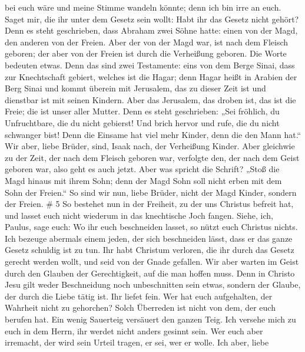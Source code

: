 bei euch wäre und meine Stimme wandeln könnte; denn ich bin irre an
euch.  Saget mir, die ihr unter dem Gesetz sein wollt: Habt
ihr das Gesetz nicht gehört?  Denn es steht geschrieben,
dass Abraham zwei Söhne hatte: einen von der Magd, den anderen von der
Freien.  Aber der von der Magd war, ist nach dem Fleisch
geboren; der aber von der Freien ist durch die Verheißung geboren.
 Die Worte bedeuten etwas. Denn das sind zwei Testamente:
eins von dem Berge Sinai, dass zur Knechtschaft gebiert, welches ist die
Hagar;  denn Hagar heißt in Arabien der Berg Sinai und
kommt überein mit Jerusalem, das zu dieser Zeit ist und dienstbar ist
mit seinen Kindern.  Aber das Jerusalem, das droben ist,
das ist die Freie; die ist unser aller Mutter.  Denn es
steht geschrieben: „Sei fröhlich, du Unfruchtbare, die du nicht
gebierst! Und brich hervor und rufe, die du nicht schwanger bist! Denn
die Einsame hat viel mehr Kinder, denn die den Mann hat.`` 
Wir aber, liebe Brüder, sind, Isaak nach, der Verheißung Kinder.
 Aber gleichwie zu der Zeit, der nach dem Fleisch geboren
war, verfolgte den, der nach dem Geist geboren war, also geht es auch
jetzt.  Aber was spricht die Schrift? „Stoß die Magd hinaus
mit ihrem Sohn; denn der Magd Sohn soll nicht erben mit dem Sohn der
Freien.``  So sind wir nun, liebe Brüder, nicht der Magd
Kinder, sondern der Freien. \# 5  So bestehet nun in der
Freiheit, zu der uns Christus befreit hat, und lasset euch nicht
wiederum in das knechtische Joch fangen.  Siehe, ich,
Paulus, sage euch: Wo ihr euch beschneiden lasset, so nützt euch
Christus nichts.  Ich bezeuge abermals einem jeden, der sich
beschneiden lässt, dass er das ganze Gesetz schuldig ist zu tun.
 Ihr habt Christum verloren, die ihr durch das Gesetz
gerecht werden wollt, und seid von der Gnade gefallen.  Wir
aber warten im Geist durch den Glauben der Gerechtigkeit, auf die man
hoffen muss.  Denn in Christo Jesu gilt weder Beschneidung
noch unbeschnitten sein etwas, sondern der Glaube, der durch die Liebe
tätig ist.  Ihr liefet fein. Wer hat euch aufgehalten, der
Wahrheit nicht zu gehorchen?  Solch Überreden ist nicht von
dem, der euch berufen hat.  Ein wenig Sauerteig versäuert
den ganzen Teig.  Ich versehe mich zu euch in dem Herrn,
ihr werdet nicht anders gesinnt sein. Wer euch aber irremacht, der wird
sein Urteil tragen, er sei, wer er wolle.  Ich aber, liebe
